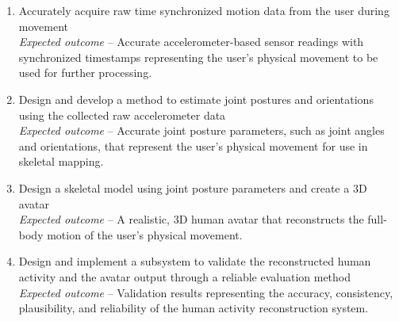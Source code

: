 \documentclass[12pt, a4paper, oneside]{report}
\begin{document}
\begin{enumerate}[leftmargin=*, itemsep=1em]
    \item{Accurately acquire raw time synchronized motion data from the user during movement} \\
    \textit{Expected outcome} -- Accurate accelerometer-based sensor readings with synchronized timestamps representing the user's physical movement to be used for further processing.

    \item {Design and develop a method to estimate joint postures and orientations using the collected raw accelerometer data} \\
    \textit{Expected outcome} -- Accurate joint posture parameters, such as joint angles and orientations, that represent the user's physical movement for use in skeletal mapping.

    \item {Design a skeletal model using joint posture parameters and create a 3D avatar} \\
    \textit{Expected outcome} -- A realistic, 3D human avatar that reconstructs the full-body motion of the user's physical movement.

    \item {Design and implement a subsystem to validate the reconstructed human activity and the avatar output through a reliable evaluation method} \\
    \textit{Expected outcome} -- Validation results representing the accuracy, consistency, plausibility, and reliability of the human activity reconstruction system.
\end{enumerate}
\vspace{\baselineskip}
\end{document}
